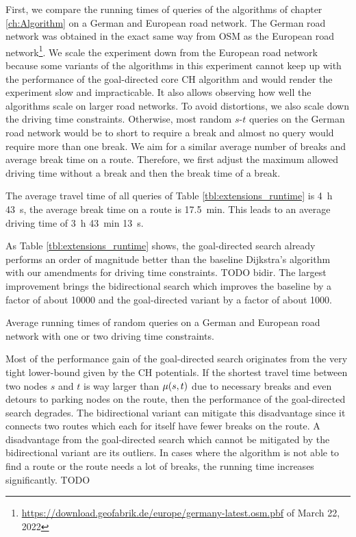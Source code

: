 First, we compare the running times of queries of the algorithms of chapter \ref{ch:Algorithm} on a German and European road network. The German road network was obtained in the exact same way from OSM as the European road network\footnote{\url{https://download.geofabrik.de/europe/germany-latest.osm.pbf} of March 22, 2022}. We scale the experiment down from the European road network because some variants of the algorithms in this experiment cannot keep up with the performance of the goal-directed core CH algorithm and would render the experiment slow and impracticable. It also allows observing how well the algorithms scale on larger road networks. To avoid distortions, we also scale down the driving time constraints. Otherwise, most random $s$-$t$ queries on the German road network would be to short to require a break and almost no query would require more than one break. We aim for a similar average number of breaks and average break time on a route. Therefore, we first adjust the maximum allowed driving time without a break and then the break time of a break.


The average travel time of all queries of Table \ref{tbl:extensions_runtime} is \SI{4}{\hour} \SI{43}{\second}, the average break time on a route is \SI{17.5}{\minute}. This leads to an average driving time of \SI{3}{\hour} \SI{43}{\minute} \SI{13}{\second}.

As Table \ref{tbl:extensions_runtime} shows, the goal-directed search already performs an order of magnitude better than the baseline Dijkstra's algorithm with our amendments for driving time constraints. TODO bidir. The largest improvement brings the bidirectional search which improves the baseline by a factor of about \num{10000} and the goal-directed variant by a factor of about \num{1000}.

\begin{table}[hbtp]
	\centering
	
	\caption{Average running times of random queries on a German and European road network with one or two driving time constraints.}
	\label{tbl:extensions_runtime}
\end{table}

Most of the performance gain of the goal-directed search originates from the very tight lower-bound given by the CH potentials. If the shortest travel time between two nodes $s$ and $t$ is way larger than $\mu(s,t)$ due to necessary breaks and even detours to parking nodes on the route, then the performance of the goal-directed search degrades. The bidirectional variant can mitigate this disadvantage since it connects two routes which each for itself have fewer breaks on the route. A disadvantage from the goal-directed search which cannot be mitigated by the bidirectional variant are its outliers. In cases where the algorithm is not able to find a route or the route needs a lot of breaks, the running time increases significantly. TODO

